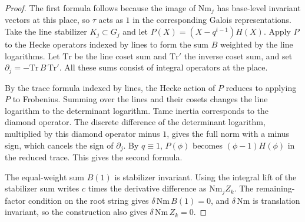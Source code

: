 \begin{proof}
The first formula follows because the image of $\mathrm{Nm}_j$ has base-level invariant vectors at this place, so $\tau$ acts as $1$ in the corresponding Galois representations. Take the line stabilizer $K_j\subset G_j$ and let $P(X)=(X-q^{t-1})H(X)$. Apply $P$ to the Hecke operators indexed by lines to form the sum $B$ weighted by the line logarithms. Let $\mathrm{Tr}$ be the line coset sum and $\mathrm{Tr}'$ the inverse coset sum, and set $\partial_j=-\mathrm{Tr}\,B\,\mathrm{Tr}'$. All these sums consist of integral operators at the place.

By the trace formula indexed by lines, the Hecke action of $P$ reduces to applying $P$ to Frobenius. Summing over the lines and their cosets changes the line logarithm to the determinant logarithm. Tame inertia corresponds to the diamond operator. The discrete difference of the determinant logarithm, multiplied by this diamond operator minus $1$, gives the full norm with a minus sign, which cancels the sign of $\partial_j$. By $q\equiv1$, $P(\phi)$ becomes $(\phi-1)H(\phi)$ in the reduced trace. This gives the second formula.

The equal-weight sum $B(1)$ is stabilizer invariant. Using the integral lift of the stabilizer sum writes $c$ times the derivative difference as $\mathrm{Nm}_j Z_k$. The remaining-factor condition on the root string gives $\delta\,\mathrm{Nm}\,B(1)=0$, and $\delta\,\mathrm{Nm}$ is translation invariant, so the construction also gives $\delta\,\mathrm{Nm}\,Z_k=0$.
\end{proof}

